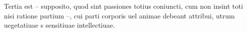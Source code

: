 \documentclass{article}
\begin{document}
\begin{ledgroup}

\beginnumbering

\pstart
Tertia est – supposito, quod sint passiones totius coniuncti, cum non insint toti nisi ratione partium –, cui parti corporis uel animae debeant attribui,  utrum uegetatiuae  s  sensitiuae 
intellectiuae.


\pend

\endnumbering
\end{ledgroup}

\makeatother
\end{document}
